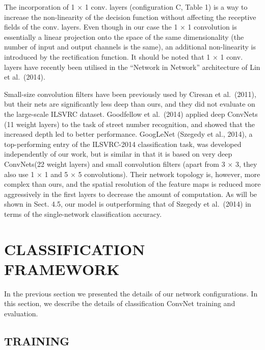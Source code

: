 \documentclass[12pt,a4paper,UTF8,twoside]{book}
\begin{document}
The incorporation of 1 × 1 conv. layers (configuration C, Table 1) is a way to increase the non-linearity of the decision function without affecting the receptive fields of the conv. layers. Even though in our case the 1 × 1 convolution is essentially a linear projection onto the space of the same dimensionality (the number of input and output channels is the same), an additional non-linearity is introduced by the rectification function. It should be noted that 1 × 1 conv. layers have recently been utilised in the ``Network in Network'' architecture of Lin et al.~(2014).

Small-size convolution filters have been previously used by Ciresan et al.~(2011), but their nets are significantly less deep than ours, and they did not evaluate on the large-scale ILSVRC dataset. Goodfellow et al.~(2014) applied deep ConvNets (11 weight layers) to the task of street number recognition, and showed that the increased depth led to better performance. GoogLeNet (Szegedy et al., 2014), a top-performing entry of the ILSVRC-2014 classification task, was developed independently of our work, but is similar in that it is based on very deep ConvNets(22 weight layers) and small convolution filters (apart from 3 × 3, they also use 1 × 1 and 5 × 5 convolutions). Their network topology is, however, more complex than ours, and the spatial resolution of the feature maps is reduced more aggressively in the first layers to decrease the amount of computation. As will be shown in Sect. 4.5, our model is outperforming that of Szegedy et al.~(2014) in terms of the single-network classification accuracy.

\hypertarget{classification-framework}{%
\section{CLASSIFICATION FRAMEWORK}\label{classification-framework}}

In the previous section we presented the details of our network configurations. In this section, we describe the details of classification ConvNet training and evaluation.

\hypertarget{training}{%
\subsection{TRAINING}\label{training}}
\end{document}
